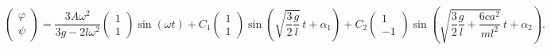 \begin{equation*}
    \begin{pmatrix}
        \varphi \\ \psi
    \end{pmatrix} = 
    \frac{3 A \omega^2}{3 g - 2 l \omega^2} \begin{pmatrix}
        1 \\ 1
    \end{pmatrix} \sin (\omega t) + 
    C_1 \begin{pmatrix}
        1 \\ 1
    \end{pmatrix}
    \sin\left(
        \sqrt{\frac{3}{2}\frac{g}{l}} \, t + \alpha_1
    \right) + 
    C_2 \begin{pmatrix}
        1 \\ -1
    \end{pmatrix} 
    \sin\left(
        \sqrt{
        \frac{3}{2} \frac{g}{l} + \frac{6 c a^2}{ml^2}
        } \, t + \alpha_2
    \right).
\end{equation*}
